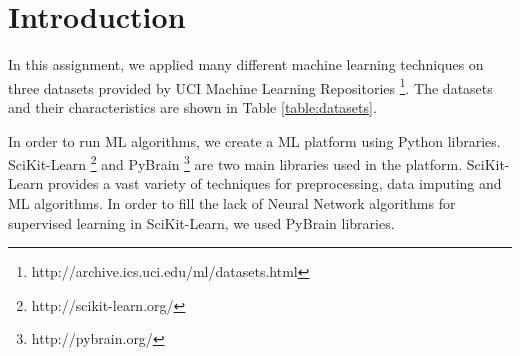 \section{Introduction}
In this assignment, we applied many different machine learning techniques on three datasets provided by UCI Machine Learning Repositories \footnote{http://archive.ics.uci.edu/ml/datasets.html}. The datasets and their characteristics are shown in Table \ref{table:datasets}.

In order to run ML algorithms, we create a ML platform using Python libraries. SciKit-Learn \footnote{http://scikit-learn.org/} and PyBrain  \footnote{http://pybrain.org/} are two main libraries used in the platform. SciKit-Learn provides a vast variety of techniques for preprocessing, data imputing and ML algorithms. In order to fill the lack of Neural Network algorithms for supervised learning in SciKit-Learn, we used PyBrain libraries.
